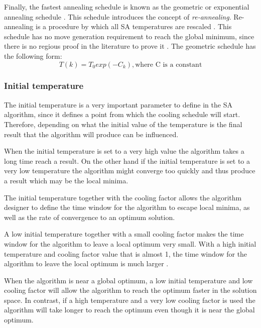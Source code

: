 Finally, the fastest annealing schedule is known as the geometric or exponential annealing schedule \cite{SASingleMultiObj}. This schedule introduces the concept of \emph{re-annealing}. Re-annealing is a procedure by which all SA temperatures are rescaled \cite{VeryFastSAImageEnchancement}. This schedule has no move generation requirement to reach the global minimum, since there is no regious proof in the literature to prove it \cite{SASingleMultiObj}. The geometric schedule has the following form:
\begin{equation}
\label{eq:geocooling}
	T(k)=T_0exp(-C_k),\text{where C is a constant}
\end{equation}
\subsubsection{Initial temperature}
The initial temperature is a very important parameter to define in the SA algorithm, since it defines a point from which the cooling schedule will start. Therefore, depending on what the initial value of the temperature is the final result that the algorithm will produce can be influenced\cite{SALongestCommon,VariousCoolingSA,AutoConfigSA}.

When the initial temperature is set to a very high value the algorithm takes a long time reach a result. On the other hand if the initial temperature is set to a very low temperature the algorithm might converge too quickly and thus produce a result which may be the local minima\cite{SALongestCommon,VariousCoolingSA,AutoConfigSA}.

The initial temperature together with the cooling factor allows the algorithm designer to define the time window for the algorithm to escape local minima, as well as the rate of convergence to an optimum solution\cite{SALongestCommon,VariousCoolingSA}.

A low initial temperature together with a small cooling factor makes the time window for the algorithm to leave a local optimum very small\cite{SALongestCommon}. With a high initial temperature and cooling factor value that is almost 1, the time window for the algorithm to leave the local optimum is much larger \cite{SALongestCommon}. 

When the algorithm is near a global optimum, a low initial temperature and low cooling factor will allow the algorithm to reach the optimum faster in the solution space. In contrast, if a high temperature and a very low cooling factor is used the algorithm will take longer to reach the optimum even though it is near the global optimum\cite{SALongestCommon}.

